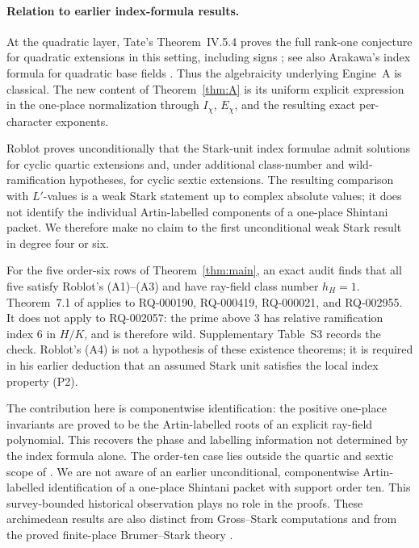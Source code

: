 \documentclass[11pt]{article}
\begin{document}
\paragraph{Relation to earlier index-formula results.}
At the quadratic layer, Tate's Theorem~IV.5.4 proves the full
rank-one conjecture for quadratic extensions in this setting,
including signs \cite{Tate1984}; see also Arakawa's index formula for
quadratic base fields \cite{Arakawa1985}.  Thus the algebraicity
underlying Engine~A is classical.  The new content of
Theorem~\ref{thm:A} is its uniform explicit expression in the
one-place normalization through \(I_\chi\), \(E_\chi\), and the
resulting exact per-character exponents.

Roblot \cite[Thms.~6.1 and~7.1]{Roblot2013} proves unconditionally
that the Stark-unit index formulae admit solutions for cyclic quartic
extensions and, under additional class-number and
wild-ramification hypotheses, for cyclic sextic extensions.  The
resulting comparison with \(L'\)-values is a weak Stark statement up
to complex absolute values; it does not identify the individual
Artin-labelled components of a one-place Shintani packet.  We
therefore make no claim to the first unconditional weak Stark result
in degree four or six.

For the five order-six rows of Theorem~\ref{thm:main}, an exact audit
finds that all five satisfy Roblot's (A1)--(A3) and have ray-field
class number \(h_H=1\).  Theorem~7.1 of \cite{Roblot2013} applies to
RQ-000190, RQ-000419, RQ-000021, and RQ-002955.  It does not apply to
RQ-002057: the prime above \(3\) has relative ramification index
\(6\) in \(H/K\), and is therefore wild.  Supplementary Table~S3
records the check.  Roblot's (A4) is not a hypothesis of these
existence theorems; it is required in his earlier deduction that an
assumed Stark unit satisfies the local index property (P2).

The contribution here is componentwise identification: the positive
one-place invariants are proved to be the Artin-labelled roots of an
explicit ray-field polynomial.  This recovers the phase and
labelling information not determined by the index formula alone.
The order-ten case lies outside the quartic and sextic scope of
\cite{Roblot2013}.  We are not aware of an earlier unconditional,
componentwise Artin-labelled identification of a one-place Shintani
packet with support order ten.  This survey-bounded historical
observation plays no role in the proofs.  These archimedean results
are also distinct from Gross--Stark computations
\cite{TangedalYoung2013} and from the proved finite-place
Brumer--Stark theory \cite{DasguptaKakde2023}.
\end{document}
